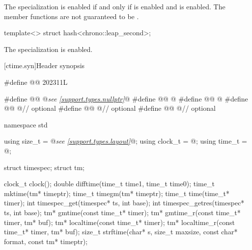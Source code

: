 \begin{itemdescr}
\pnum
The specialization 
is enabled
if and only if  is enabled and
 is enabled.
The member functions are not guaranteed to be .
\end{itemdescr}

%
\begin{itemdecl}
template<> struct hash<chrono::leap_second>;
\end{itemdecl}

\begin{itemdescr}
\pnum
The specialization is enabled.
\end{itemdescr}

[ctime.syn]{Header  synopsis}

%
%
%
%
%
%
%
%
%
%
%
%
%
%
%
%
%
%
\begin{codeblock}
#define @@ 202311L

#define @@ @\textit{see \ref{support.types.nullptr}}@
#define @@ @\seebelow@
#define @@ @\seebelow@
#define @@ @\seebelow@     // optional
#define @@ @\seebelow@        // optional
#define @@ @\seebelow@ // optional

namespace std {
  using size_t = @\textit{see \ref{support.types.layout}}@;
  using clock_t = @\seebelow@;
  using time_t = @\seebelow@;

  struct timespec;
  struct tm;

  clock_t clock();
  double difftime(time_t time1, time_t time0);
  time_t mktime(tm* timeptr);
  time_t timegm(tm* timeptr);
  time_t time(time_t* timer);
  int timespec_get(timespec* ts, int base);
  int timespec_getres(timespec* ts, int base);
  tm* gmtime(const time_t* timer);
  tm* gmtime_r(const time_t* timer, tm* buf);
  tm* localtime(const time_t* timer);
  tm* localtime_r(const time_t* timer, tm* buf);
  size_t strftime(char* s, size_t maxsize, const char* format, const tm* timeptr);
}
\end{codeblock}

